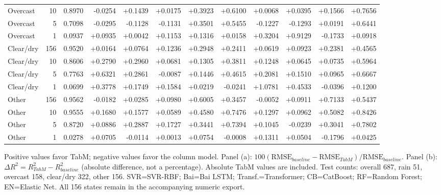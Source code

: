 \begin{table}[!htbp]
{\begin{tabular}{lrrrrrrrrrrr}
Overcast & 10 & 0.8970 & -0.0254 & +0.1439 & +0.0175 & +0.3923 & +0.6100 & +0.0068 & +0.0395 & +0.1566 & +0.7656 \\
Overcast & 5 & 0.7098 & -0.0295 & -0.1128 & -0.1131 & +0.3501 & +0.5455 & -0.1227 & -0.1293 & +0.0191 & +0.6441 \\
Overcast & 1 & 0.0937 & +0.0935 & +0.0042 & +0.1153 & +0.1316 & +0.0158 & +0.3204 & +0.9129 & -0.1733 & +0.0918 \\
Clear/dry & 156 & 0.9520 & +0.0164 & +0.0764 & +0.1236 & +0.2948 & +0.2411 & +0.0619 & +0.0923 & +0.2381 & +0.4565 \\
Clear/dry & 10 & 0.8606 & +0.2790 & +0.2960 & +0.0681 & +0.1305 & +0.3811 & +0.1248 & +0.0645 & +0.0735 & +0.5964 \\
Clear/dry & 5 & 0.7763 & +0.6321 & +0.2861 & -0.0087 & +0.1446 & +0.4615 & +0.2081 & +0.1510 & +0.0965 & +0.6667 \\
Clear/dry & 1 & 0.0699 & +0.3778 & +0.1749 & +0.1584 & +0.0219 & -0.0241 & +1.0781 & +0.4533 & -0.0396 & +0.1200 \\
Other & 156 & 0.9562 & -0.0182 & +0.0285 & +0.0980 & +0.6005 & +0.3457 & -0.0052 & +0.0911 & +0.7133 & +0.5437 \\
Other & 10 & 0.9555 & +0.1680 & +0.1577 & +0.0589 & +0.4580 & +0.7476 & +0.1297 & +0.0962 & +0.5082 & +0.8426 \\
Other & 5 & 0.8720 & +0.0886 & +0.2887 & +0.1727 & +0.3441 & +0.7394 & +0.1045 & -0.0239 & +0.3041 & +0.7802 \\
Other & 1 & 0.0278 & +0.0705 & -0.0114 & +0.0013 & +0.0754 & -0.0008 & +0.1311 & +0.0504 & -0.1796 & +0.0425 \\
\bottomrule
\end{tabular}
}
\par\smallskip
\begin{minipage}{\textwidth}\footnotesize Positive values favor TabM; negative values favor the column model. Panel (a): $100(\mathrm{RMSE}_{baseline}-\mathrm{RMSE}_{TabM})/\mathrm{RMSE}_{baseline}$. Panel (b): $\Delta R^2=R^2_{TabM}-R^2_{baseline}$ (absolute difference, not a percentage). Absolute TabM values are included. Test counts: overall 687, rain 51, overcast 158, clear/dry 322, other 156. SVR=SVR-RBF; Bai=Bai LSTM; Transf.=Transformer; CB=CatBoost; RF=Random Forest; EN=Elastic Net. All 156 states remain in the accompanying numeric export.\end{minipage}
\end{table}
\endgroup
